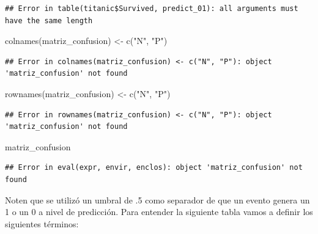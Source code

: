 \documentclass[
  12pt,
]{book}
\newenvironment{Shaded}{\begin{snugshade}}{\end{snugshade}}
\newcommand{\FunctionTok}[1]{\textcolor[rgb]{0.00,0.00,0.00}{#1}}
\newcommand{\NormalTok}[1]{#1}
\newcommand{\OtherTok}[1]{\textcolor[rgb]{0.56,0.35,0.01}{#1}}
\newcommand{\StringTok}[1]{\textcolor[rgb]{0.31,0.60,0.02}{#1}}
\theoremstyle{definition}
\theoremstyle{definition}
\theoremstyle{definition}
\theoremstyle{definition}
\theoremstyle{remark}
\begin{document}
\begin{verbatim}
## Error in table(titanic$Survived, predict_01): all arguments must have the same length
\end{verbatim}

\begin{Shaded}
\begin{Highlighting}[]
\FunctionTok{colnames}\NormalTok{(matriz\_confusion) }\OtherTok{\textless{}{-}} \FunctionTok{c}\NormalTok{(}\StringTok{"N"}\NormalTok{, }\StringTok{"P"}\NormalTok{)}
\end{Highlighting}
\end{Shaded}

\begin{verbatim}
## Error in colnames(matriz_confusion) <- c("N", "P"): object 'matriz_confusion' not found
\end{verbatim}

\begin{Shaded}
\begin{Highlighting}[]
\FunctionTok{rownames}\NormalTok{(matriz\_confusion) }\OtherTok{\textless{}{-}} \FunctionTok{c}\NormalTok{(}\StringTok{"N"}\NormalTok{, }\StringTok{"P"}\NormalTok{)}
\end{Highlighting}
\end{Shaded}

\begin{verbatim}
## Error in rownames(matriz_confusion) <- c("N", "P"): object 'matriz_confusion' not found
\end{verbatim}

\begin{Shaded}
\begin{Highlighting}[]
\NormalTok{matriz\_confusion}
\end{Highlighting}
\end{Shaded}

\begin{verbatim}
## Error in eval(expr, envir, enclos): object 'matriz_confusion' not found
\end{verbatim}

Noten que se utilizó un umbral de .5 como separador de que un evento genera un 1 o un 0 a nivel de predicción. Para entender la siguiente tabla vamos a definir los siguientes términos:
\end{document}
